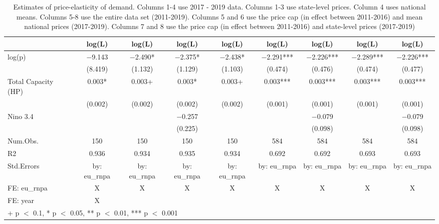 \begin{table}

\caption{\label{tab:}Estimates of price-elasticity of demand.
             Columns 1-4 use 2017 - 2019 data.
             Columns 1-3 use state-level prices. Column 4 uses national means.
             Columns 5-8 use the entire data set (2011-2019).
             Columns 5 and 6 use the price cap (in effect between 2011-2016) and mean national prices (2017-2019).
             Columns 7 and 8 use the price cap (in effect between 2011-2016) and state-level prices (2017-2019)}
\centering
\begin{tabular}[t]{lcccccccc}
\toprule
  & log(L) & log(L)  & log(L)   & log(L)    & log(L)     & log(L)      & log(L)       & log(L)       \\
\midrule
log(p) & \num{-9.143} & \num{-2.490}* & \num{-2.375}* & \num{-2.438}* & \num{-2.291}*** & \num{-2.226}*** & \num{-2.289}*** & \num{-2.226}***\\
 & (\num{8.419}) & (\num{1.132}) & (\num{1.129}) & (\num{1.103}) & (\num{0.474}) & (\num{0.476}) & (\num{0.474}) & (\num{0.477})\\
Total Capacity (HP) & \num{0.003}* & \num{0.003}+ & \num{0.003}* & \num{0.003}+ & \num{0.003}*** & \num{0.003}*** & \num{0.003}*** & \num{0.003}***\\
 & (\num{0.002}) & (\num{0.002}) & (\num{0.002}) & (\num{0.002}) & (\num{0.001}) & (\num{0.001}) & (\num{0.001}) & (\num{0.001})\\
Nino 3.4 &  &  & \num{-0.257} &  &  & \num{-0.079} &  & \num{-0.079}\\
 &  &  & (\num{0.225}) &  &  & (\num{0.098}) &  & (\num{0.098})\\
\midrule
Num.Obs. & \num{150} & \num{150} & \num{150} & \num{150} & \num{584} & \num{584} & \num{584} & \num{584}\\
R2 & \num{0.936} & \num{0.934} & \num{0.935} & \num{0.934} & \num{0.692} & \num{0.692} & \num{0.693} & \num{0.693}\\
Std.Errors & by: eu\_rnpa & by: eu\_rnpa & by: eu\_rnpa & by: eu\_rnpa & by: eu\_rnpa & by: eu\_rnpa & by: eu\_rnpa & by: eu\_rnpa\\
FE: eu_rnpa & X & X & X & X & X & X & X & X\\
FE: year & X &  &  &  &  &  &  & \\
\bottomrule
\multicolumn{9}{l}{\rule{0pt}{1em}+ p $<$ 0.1, * p $<$ 0.05, ** p $<$ 0.01, *** p $<$ 0.001}\\
\end{tabular}
\end{table}
